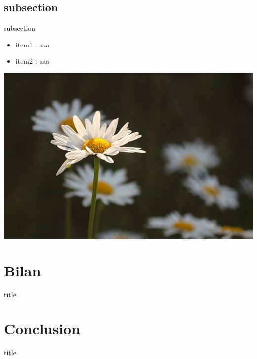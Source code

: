 \documentclass[french,pdf]{beamer}
\begin{document}
\subsection{subsection}
\begin{frame}{subsection}
  \begin{itemize}
    \item item1 : aaa
    \item item2 : aaa
  \end{itemize}
  \begin{center}
    \includegraphics[scale=0.3]{img.jpg}
  \end{center}
\end{frame}

\section{Bilan}
\begin{frame}
  \vfill
  \centering
  \begin{beamercolorbox}[sep=8pt,center,shadow=true,rounded=true]{title}
    \insertsectionhead\par%
  \end{beamercolorbox}
  \vfill
\end{frame}

\section{Conclusion}
\begin{frame}
  \vfill
  \centering
  \begin{beamercolorbox}[sep=8pt,center,shadow=true,rounded=true]{title}
    \insertsectionhead\par%
  \end{beamercolorbox}
  \vfill
\end{frame}
\end{document}
